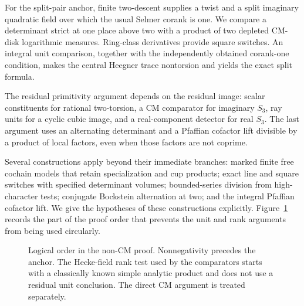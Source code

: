 For the split-pair anchor, finite two-descent supplies a twist and a
split imaginary quadratic field over which the usual Selmer corank is
one. We compare a determinant strict at one place above two with a
product of two depleted CM-disk logarithmic measures. Ring-class
derivatives provide square switches. An integral unit comparison,
together with the independently obtained corank-one condition, makes
the central Heegner trace nontorsion and yields the exact split formula.

The residual primitivity argument depends on the residual image: scalar
constituents for rational two-torsion, a CM comparator for imaginary
\(S_3\), ray units for a cyclic cubic image, and a real-component
detector for real \(S_3\).  The last argument uses an alternating
determinant and a Pfaffian cofactor lift divisible by a product of local
factors, even when those factors are not coprime.

Several constructions apply beyond their immediate branches: marked
finite free cochain models that retain specialization and cup products;
exact line and square switches with specified determinant volumes;
bounded-series division from high-character tests; conjugate Bockstein
alternation at two; and the integral Pfaffian cofactor lift.  We give
the hypotheses of these constructions explicitly.  Figure~\ref{fig:logic}
records the part of the proof order that prevents the unit and rank
arguments from being used circularly.

\begin{figure}[htbp]
\centering
{}
\caption{Logical order in the non-CM proof.  Nonnegativity precedes
the anchor.  The Hecke-field rank test used by the comparators starts
with a classically known simple analytic product and does not use a
residual unit conclusion.  The direct CM argument is treated separately.}
\label{fig:logic}
\end{figure}

